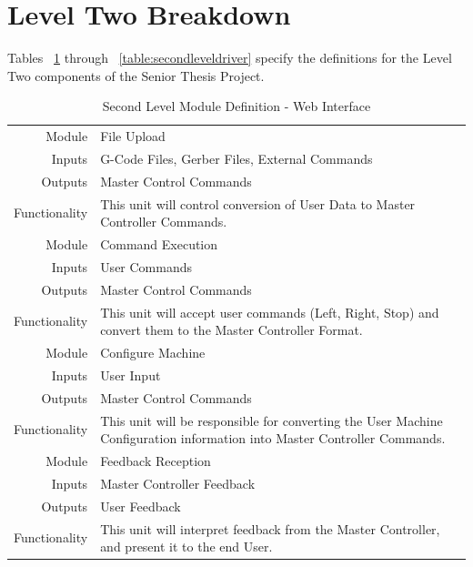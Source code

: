 \section{Level Two Breakdown}
Tables ~\ref{table:secondlevelweb} through ~\ref{table:secondleveldriver} specify the definitions for the Level Two components of the Senior Thesis Project.
\begin{table}[H] 
	\caption{Second Level Module Definition - Web Interface}
	\label{table:secondlevelweb}
	\centering 
	\begin{tabular}{|r p{10cm}|} 
		\hline\hline 
		Module		& File Upload \\ 
		Inputs		& G-Code Files, Gerber Files, External Commands	\\ 
		Outputs		& Master Control Commands \\ 
		Functionality	& This unit will control conversion of User Data to Master Controller Commands.\\ 
		\hline\hline 
		Module		& Command Execution \\ 
		Inputs		& User Commands	\\ 
		Outputs		& Master Control Commands \\ 
		Functionality	& This unit will accept user commands (Left, Right, Stop) and convert them to the Master Controller Format.\\
		\hline\hline 
		Module		& Configure Machine \\ 
		Inputs		& User Input \\ 
		Outputs		& Master Control Commands \\ 
		Functionality	& This unit will be responsible for converting the User Machine Configuration information into Master Controller Commands.\\
		\hline\hline 
		Module		& Feedback Reception \\ 
		Inputs		& Master Controller Feedback \\ 
		Outputs		& User Feedback \\ 
		Functionality	& This unit will interpret feedback from the Master Controller, and present it to the end User. \\
		\hline
		\end{tabular} 
\end{table}

